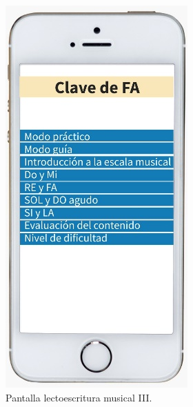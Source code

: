 \documentclass[spanish]{textolivre}
\begin{document}
\hfill
\begin{minipage}[b]{0.30\textwidth}
    \begin{figure}[H]
        \centering
        \includegraphics[width=\linewidth]{Fig4.png}
        \caption{Pantalla lectoescritura musical III.}
    \end{figure}
\end{minipage}
\clearpage
\end{document}
